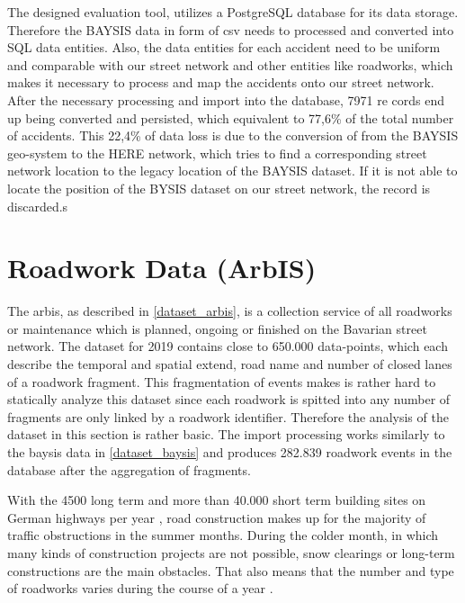 The designed evaluation tool, utilizes a PostgreSQL database for its data storage. Therefore the BAYSIS data in form of \acrfull{csv} needs to processed and converted into SQL data entities. Also, the data entities for each accident need to be uniform and comparable with our street network and other entities like roadworks, which makes it necessary to process and map the accidents onto our street network. After the necessary processing and import into the database, 7971 re cords end up being converted and persisted, which equivalent to 77,6\% of the total number of accidents. This 22,4\% of data loss is due to the conversion of from the BAYSIS geo-system to the HERE network, which tries to find a corresponding street network location to the legacy location of the BAYSIS dataset. If it is not able to locate the position of the BYSIS dataset on our street network, the record is discarded.s

\section{Roadwork Data (ArbIS)}
\label{dataset_arbis}

The \acrfull{arbis}, as described in \autoref{dataset_arbis}, is a collection service of all roadworks or maintenance which is planned, ongoing or finished on the Bavarian street network. The dataset for 2019 contains close to 650.000 data-points, which each describe the temporal and spatial extend, road name and number of closed lanes of a roadwork fragment. This fragmentation of events makes is rather hard to statically analyze this dataset since each roadwork is spitted into any number of fragments are only linked by a roadwork identifier. Therefore the analysis of the dataset in this section is rather basic. The import processing works similarly to the \acrshort{baysis} data in \autoref{dataset_baysis} and produces 282.839 roadwork events in the database after the aggregation of fragments. 

With the 4500 long term and more than 40.000 short term building sites on German highways per year \parencite{LAPID2018,Stmi2020}, road construction makes up for the majority of traffic obstructions in the summer months. During the colder month, in which many kinds of construction projects are not possible, snow clearings or long-term constructions are the main obstacles. That also means that the number and type of roadworks varies during the course of a year \parencite{Stmi2020}. 

